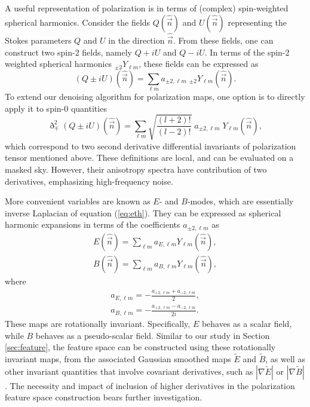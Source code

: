 \documentclass{aa}
\begin{document}
A useful representation of polarization is in terms of (complex) spin-weighted spherical harmonics. Consider the fields $Q(\hat{\vec{n}})$ and $U(\hat{\vec{n}})$ representing the Stokes parameters $Q$ and $U$ in the direction $\hat{\vec{n}}$. From these fields, one can construct two spin-2 fields, namely $Q + iU$ and $Q - iU$. In terms of the spin-2 weighted spherical harmonics $_{\pm 2}Y_{\ell m}$, these fields can be expressed as
%
\begin{equation}
    (Q \pm iU)(\hat{\vec{n}}) = \sum_{\ell m} a_{\pm 2,\ell m} \; _{\pm 2}Y_{\ell m}(\hat{\vec{n}}) .
\end{equation}
%
To extend our denoising algorithm for polarization maps, one option is to directly apply it to spin-0 quantities
%
\begin{equation} \label{eq:eth}
    \eth^{2}_{\mp} (Q \pm iU)(\hat{\vec{n}}) = \sum_{\ell m} \sqrt{\frac{(l+2)!}{(l-2)!}} \; a_{\pm 2,\ell m} \; Y_{\ell m}(\hat{\vec{n}}) ,
\end{equation}
%
which correspond to two second derivative differential invariants of polarization tensor mentioned above. These definitions are local, and can be evaluated on a masked sky. However, their anisotropy spectra have contribution of two derivatives, emphasizing high-frequency noise.

More convenient variables are known as $E$- and $B$-modes, which are essentially inverse Laplacian of equation (\ref{eq:eth}). They can be expressed as spherical harmonic expansions in terms of the coefficients $a_{\pm 2,\ell m}$ as
%
\begin{equation}
    \begin{aligned}
        E(\hat{\vec{n}}) = \sum_{\ell m} a_{E,\ell m} Y_{\ell m}(\hat{\vec{n}}) , \\
        B(\hat{\vec{n}}) = \sum_{\ell m} a_{B,\ell m} Y_{\ell m}(\hat{\vec{n}}) ,
    \end{aligned}
\end{equation}
%
where
%
\begin{equation}
    \begin{aligned}
        a_{E,\ell m} =  -\frac{a_{+2,\ell m} + a_{-2,\ell m}}{2} , \\
        a_{B,\ell m} = -\frac{a_{+2,\ell m} - a_{-2,\ell m}}{2i} .
    \end{aligned}
\end{equation}
%
These maps are rotationally invariant. Specifically, $E$ behaves as a scalar field, while $B$ behaves as a pseudo-scalar field. Similar to our study in Section \ref{sec:feature}, the feature space can be constructed using these rotationally invariant maps, from the associated Gaussian smoothed maps $\tilde{E}$ and $\tilde{B}$, as well as other invariant quantities that involve covariant derivatives, such as $|\nabla \tilde{E}|$ or $|\nabla \tilde{B}|$. The necessity and impact of inclusion of higher derivatives in the polarization feature space construction bears further investigation.
\end{document}
